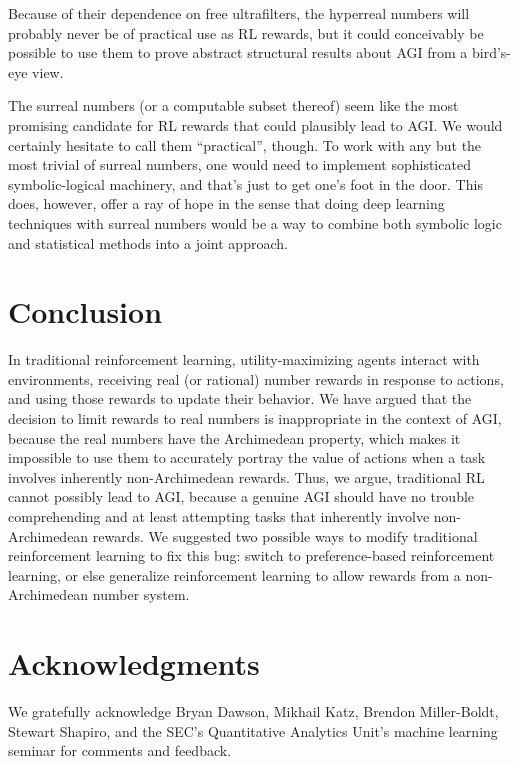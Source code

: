 \documentclass[twoside,11pt]{article}
\begin{document}
Because of their dependence on free ultrafilters, the hyperreal numbers will
probably never be of practical use as RL rewards, but it could conceivably be
possible to use them to prove abstract structural results about AGI from a
bird's-eye view.

The surreal numbers (or a computable subset thereof) seem like the most promising
candidate for RL rewards that could plausibly lead to AGI. We would certainly
hesitate to call them ``practical'', though. To work with any but the most trivial
of surreal numbers, one would need to implement sophisticated symbolic-logical
machinery, and that's just to get one's foot in the door. This does, however, offer
a ray of hope in the sense that doing deep learning techniques with surreal numbers
would be a way to combine both symbolic logic and statistical methods into a joint
approach.



\section{Conclusion}
\label{conclusionsection}

In traditional reinforcement learning, utility-maximizing agents interact
with environments, receiving real (or rational) number rewards in response to
actions, and using those rewards to update their behavior. We have argued that
the decision to limit rewards to real numbers is inappropriate in the context
of AGI, because the real numbers have the Archimedean property, which makes it
impossible to use them to accurately portray the value of actions when a task
involves inherently non-Archimedean rewards. Thus, we argue, traditional
RL cannot possibly lead to AGI, because a genuine AGI should have no trouble
comprehending and at least attempting tasks that inherently involve
non-Archimedean rewards. We suggested two possible ways
to modify traditional reinforcement learning to fix this bug: switch to
preference-based reinforcement learning, or else generalize reinforcement learning
to allow rewards from a non-Archimedean number system.

\section*{Acknowledgments}

We gratefully acknowledge Bryan Dawson, Mikhail Katz,
Brendon Miller-Boldt, Stewart Shapiro, and the
SEC's Quantitative Analytics Unit's machine learning seminar
for comments and feedback.

%

\end{document}
